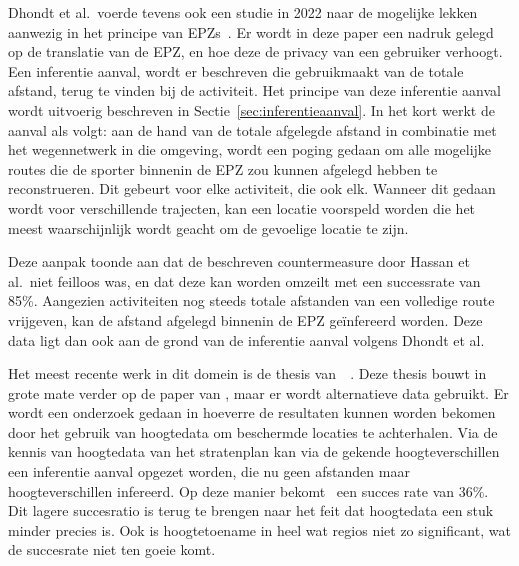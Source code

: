 Dhondt et al.\ voerde tevens ook een studie in 2022 naar de mogelijke lekken
aanwezig in het principe van
\acp{EPZ}~\cite{Dhondt_Pochat_Voulimeneas_Joosen_Volckaert_2022}. Er wordt in
deze paper een nadruk gelegd op de translatie van de \ac{EPZ}, en hoe deze de
privacy van een gebruiker verhoogt. Een inferentie aanval, wordt er beschreven
die gebruikmaakt van de totale afstand, terug te vinden bij de activiteit. Het
principe van deze inferentie aanval wordt uitvoerig beschreven in
Sectie~\ref{sec:inferentieaanval}. In het kort werkt de aanval als volgt: aan
de hand van de totale afgelegde afstand in combinatie met het wegennetwerk in
die omgeving, wordt een poging gedaan om alle mogelijke routes die de sporter
binnenin de \ac{EPZ} zou kunnen afgelegd hebben te reconstrueren. Dit gebeurt
voor elke activiteit, die ook elk. Wanneer dit gedaan wordt voor verschillende
trajecten, kan een locatie voorspeld worden die het meest waarschijnlijk wordt
geacht om de gevoelige locatie te zijn.

Deze aanpak toonde aan dat de beschreven countermeasure door Hassan et al.\
niet feilloos was, en dat deze kan worden omzeilt met een successrate van 85\%.
Aangezien activiteiten nog steeds totale afstanden van een volledige route
vrijgeven, kan de afstand afgelegd binnenin de EPZ geïnfereerd worden. Deze
data ligt dan ook aan de grond van de inferentie aanval volgens Dhondt et al.

Het meest recente werk in dit domein is de thesis
van~\citeauthor{Verdonck_2022}~\cite{Verdonck_2022}. Deze thesis bouwt in grote
mate verder op de paper van
\citeauthor{Dhondt_Pochat_Voulimeneas_Joosen_Volckaert_2022}, maar er wordt
alternatieve data gebruikt. Er wordt een onderzoek gedaan in hoeverre de
resultaten kunnen worden bekomen door het gebruik van hoogtedata om beschermde
locaties te achterhalen. Via de kennis van hoogtedata van het stratenplan kan
via de gekende hoogteverschillen een inferentie aanval opgezet worden, die nu
geen afstanden maar hoogteverschillen infereerd. Op deze manier
bekomt~\citeauthor{Verdonck_2022} een succes rate van 36\%. Dit lagere
succesratio is terug te brengen naar het feit dat hoogtedata een stuk minder
precies is. Ook is hoogtetoename in heel wat regios niet zo significant, wat de
succesrate niet ten goeie komt.